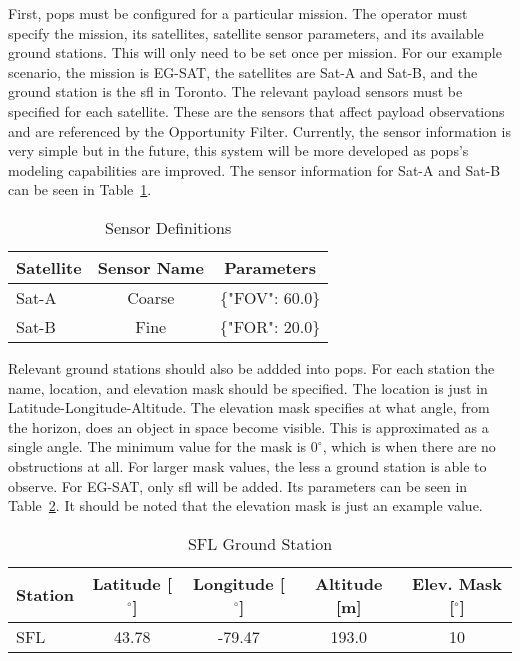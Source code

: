 First, \gls{pops} must be configured for a particular mission. The operator
must specify the mission, its satellites, satellite sensor parameters, and its
available ground stations. This will only need to be set once per mission. For
our example scenario, the mission is EG-SAT, the satellites are Sat-A and
Sat-B, and the ground station is the \gls{sfl} in Toronto. The relevant payload
sensors must be specified for each satellite. These are the sensors that affect
payload observations and are referenced by the Opportunity Filter. Currently,
the sensor information is very simple but in the future, this system will be
more developed as \gls{pops}'s modeling capabilities are improved. The sensor
information for Sat-A and Sat-B can be seen in Table~\ref{tab:sensors}. 

\begin{table}[h] 
    \centering
    \caption{Sensor Definitions}
    \begin{tabular}{ccc}
	Satellite                  & Sensor Name & Parameters    \\ \hline
	\multicolumn{1}{l|}{Sat-A} & Coarse      & \{"FOV": 60.0\} \\
	\multicolumn{1}{l|}{Sat-B} & Fine        & \{"FOR": 20.0\}
    \end{tabular}
    \label{tab:sensors}
\end{table}

Relevant ground stations should also be addded into \gls{pops}. For each
station the name, location, and elevation mask should be specified. The
location is just in Latitude-Longitude-Altitude. The elevation mask specifies
at what angle, from the horizon, does an object in space become visible. This
is approximated as a single angle. The minimum value for the mask is $0^\circ$,
which is when there are no obstructions at all. For larger mask values, the
less a ground station is able to observe. For EG-SAT, only \gls{sfl} will be
added. Its parameters can be seen in Table~\ref{tab:ground-stations}. It should
be noted that the elevation mask is just an example value.

\begin{table}[h] 
    \centering
    \caption{SFL Ground Station}
    \begin{tabular}{ccccc}
	Station                  & Latitude [$^\circ$] & Longitude [$^\circ$] & Altitude [m] & Elev. Mask [$^\circ$] \\ \hline
	\multicolumn{1}{l|}{SFL} & 43.78   & -79.47   & 193.0  & 10      \\
    \end{tabular}
    \label{tab:ground-stations}
\end{table}

